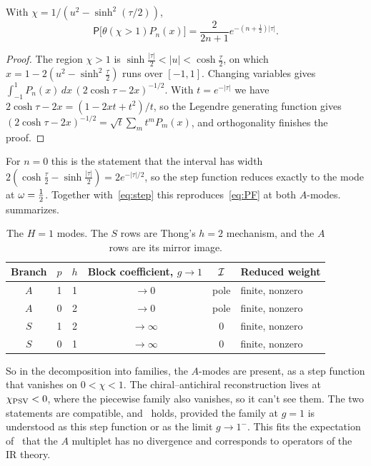 \begin{lemma}\label{lem:step}
With $\chi=1/(u^2-\sinh^2(\tau/2))$,
\begin{equation}\label{eq:step-lemma}
\mathsf P\big[\theta(\chi>1)P_n(x)\big]=\frac{2}{2n+1}e^{-(n+\frac12)|\tau|}.
\end{equation}
\end{lemma}

\begin{proof}
The region $\chi>1$ is $\sinh\frac{|\tau|}{2}<|u|<\cosh\frac\tau2$, on which $x=1-2(u^2-\sinh^2\frac\tau2)$ runs over $[-1,1]$. Changing variables gives $\int_{-1}^1P_n(x)\,dx\,(2\cosh\tau-2x)^{-1/2}$. With $t=e^{-|\tau|}$ we have $2\cosh\tau-2x=(1-2xt+t^2)/t$, so the Legendre generating function gives $(2\cosh\tau-2x)^{-1/2}=\sqrt t\sum_mt^mP_m(x)$, and orthogonality finishes the proof.
\end{proof}

For $n=0$ this is the statement that the interval has width $2(\cosh\frac\tau2-\sinh\frac{|\tau|}2)=2e^{-|\tau|/2}$, so the step function reduces exactly to the mode at $\omega=\tfrac12$. Together with~\eqref{eq:step} this reproduces~\eqref{eq:PF} at both $A$-modes.  summarizes.

\begin{table}[t]
\centering
\renewcommand{\arraystretch}{1.2}
\begin{tabular}{@{}cccccl@{}}
\toprule
Branch & $p$ & $h$ & Block coefficient, $g\to1$ & $\mathcal{I}$ & Reduced weight\\
\midrule
$A$ & 1 & 1 & $\to0$ & pole & finite, nonzero\\
$A$ & 0 & 2 & $\to0$ & pole & finite, nonzero\\
$S$ & 1 & 2 & $\to\infty$ & 0 & finite, nonzero\\
$S$ & 0 & 1 & $\to\infty$ & 0 & finite, nonzero\\
\bottomrule
\end{tabular}
\caption{The $H=1$ modes. The $S$ rows are Thong's $h=2$ mechanism, and the $A$ rows are its mirror image.}
\label{tab:exceptional}
\end{table}

So in the decomposition into families, the $A$-modes are present, as a step function that vanishes on $0<\chi<1$. The chiral--antichiral reconstruction lives at $\chi_{\rm PSV}<0$, where the piecewise family also vanishes, so it can't see them. The two statements are compatible, and~\cite[(3.13)]{Thong:2026} holds, provided the family at $g=1$ is understood as this step function or as the limit $g\to1^-$. This fits the expectation of~\cite{Fu:2016vas} that the $A$ multiplet has no divergence and corresponds to operators of the IR theory.

